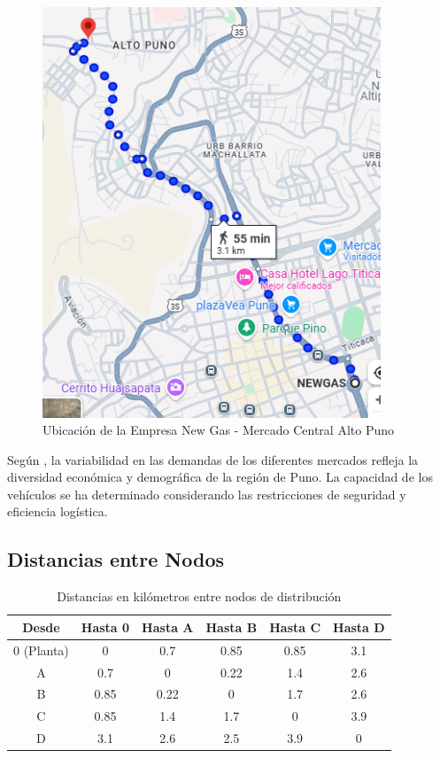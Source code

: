 \documentclass[11pt, a4paper]{article}
\begin{document}
\begin{figure}[H]
\begin{minipage}{0.48\textwidth}
  \includegraphics[width=0.9\textwidth]{altopuno.png}
  \caption{Ubicación de la Empresa New Gas - Mercado Central Alto Puno}
  \label{fig:altopuno}
\end{minipage}
\end{figure}

Según \citet{Cornejo2018}, la variabilidad en las demandas de los diferentes mercados refleja la diversidad económica y demográfica de la región de Puno. La capacidad de los vehículos se ha determinado considerando las restricciones de seguridad y eficiencia logística.

\subsection{Distancias entre Nodos}
\begin{table}[H]
\centering
\begin{tabular}{|c|c|c|c|c|c|}
\hline
\textbf{Desde} & \textbf{Hasta 0} & \textbf{Hasta A}& \textbf{Hasta B}& \textbf{Hasta C}& \textbf{Hasta D}\\
\hline
0 (Planta) & 0 & 0.7& 0.85& 0.85& 3.1\\
\hline
A& 0.7& 0 & 0.22& 1.4& 2.6\\
\hline
B& 0.85& 0.22& 0 & 1.7& 2.6\\
\hline
C& 0.85& 1.4& 1.7& 0 & 3.9\\
\hline
D& 3.1& 2.6& 2.5& 3.9& 0 \\
\hline
\end{tabular}
\caption{Distancias en kilómetros entre nodos de distribución}
\label{tab:distancias_nodos}
\end{table}
\end{document}

